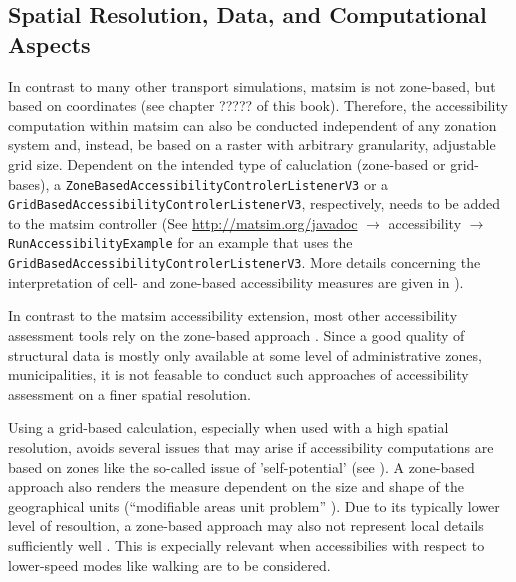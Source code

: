 

\subsection{Spatial Resolution, Data, and Computational Aspects}
In contrast to many other transport simulations, \gls{matsim} is not zone-based, but based on coordinates (see 
chapter ????? of this book).
Therefore, the accessibility computation within \gls{matsim} can also be conducted independent 
of any zonation system and, instead, be based on a raster with arbitrary granularity, \ie adjustable grid
size. Dependent on the intended type of caluclation (zone-based or grid-bases), a 
\lstinline{ZoneBasedAccessibilityControlerListenerV3} or a 
\lstinline{GridBasedAccessibilityControlerListenerV3}, respectively, needs to be added to the \gls{matsim} controller 
(See \url{http://matsim.org/javadoc} $\to$ accessibility $\to$ \lstinline{RunAccessibilityExample} for an example
that uses the \lstinline{GridBasedAccessibilityControlerListenerV3}. More details concerning the interpretation
of cell- and zone-based accessibility measures are given in \citet{NicolaiNagel2012HiResAccessibilityMethodInBook}).

In contrast to the \gls{matsim} accessibility extension, most other accessibility assessment tools
rely on the zone-based approach 
\citep{CurtisEtAl2013AccessibilityPolicyInnovation, LiuZhu2004AccessibilityAnalyst, BuettnerEtAl2010Erreichbarkeitsatlas}.
Since a good quality of structural data is mostly only available at some level of administrative zones, 
\eg municipalities, it is not feasable to conduct such approaches of accessibility assessment on a finer 
spatial resolution.

Using a grid-based calculation, especially when used with a high spatial resolution, avoids several issues
that may arise if accessibility computations are based on zones like the so-called issue of 'self-potential'
(see \citep[e.g.,][]{NicolaiNagel2012HiResAccessibilityMethodInBook}). A zone-based approach also renders the 
measure dependent on the size and shape of the geographical units (“modifiable areas unit problem” 
\citep{Openshaw1984MAUP}). Due to its typically lower level of resoultion, a zone-based approach may also
not represent local details sufficiently well \citep{Kwan1998PointBasedAccessibility}. This is expecially relevant
when accessibilies with respect to lower-speed modes like walking are to be considered.

